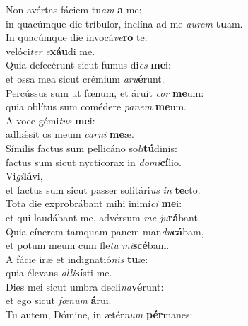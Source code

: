 \evenverse Non avértas fáciem tu\textit{am} \textbf{a} me:~\*\\
\evenverse in quacúmque die tríbulor, inclína ad me \textit{au}\textit{rem} \textbf{tu}am.\\
\oddverse In quacúmque die invocá\textit{ve}\textbf{ro} te:~\*\\
\oddverse velóci\textit{ter} \textit{e}\textbf{xáu}di me.\\
\evenverse Quia defecérunt sicut fumus di\textit{es} \textbf{me}i:~\*\\
\evenverse et ossa mea sicut crémium \textit{a}\textit{ru}\textbf{é}runt.\\
\oddverse Percússus sum ut fœnum, et áruit \textit{cor} \textbf{me}um:~\*\\
\oddverse quia oblítus sum comédere \textit{pa}\textit{nem} \textbf{me}um.\\
\evenverse A voce gémi\textit{tus} \textbf{me}i:~\*\\
\evenverse adhǽsit os meum \textit{car}\textit{ni} \textbf{me}æ.\\
\oddverse Símilis factus sum pellicáno so\textit{li}\textbf{tú}dinis:~\*\\
\oddverse factus sum sicut nyctícorax in \textit{do}\textit{mi}\textbf{cí}lio.\\
\evenverse Vi\textit{gi}\textbf{lá}vi,~\*\\
\evenverse et factus sum sicut passer solitári\textit{us} \textit{in} \textbf{te}cto.\\
\oddverse Tota die exprobrábant mihi inimí\textit{ci} \textbf{me}i:~\*\\
\oddverse et qui laudábant me, advérsum \textit{me} \textit{ju}\textbf{rá}bant.\\
\evenverse Quia cínerem tamquam panem man\textit{du}\textbf{cá}bam,~\*\\
\evenverse et potum meum cum fle\textit{tu} \textit{mi}\textbf{scé}bam.\\
\oddverse A fácie iræ et indignatió\textit{nis} \textbf{tu}æ:~\*\\
\oddverse quia élevans \textit{al}\textit{li}\textbf{sí}sti me.\\
\evenverse Dies mei sicut umbra decli\textit{na}\textbf{vé}runt:~\*\\
\evenverse et ego sicut \textit{fœ}\textit{num} \textbf{á}rui.\\
\oddverse Tu autem, Dómine, in ætér\textit{num} \textbf{pér}manes:~\*\\
